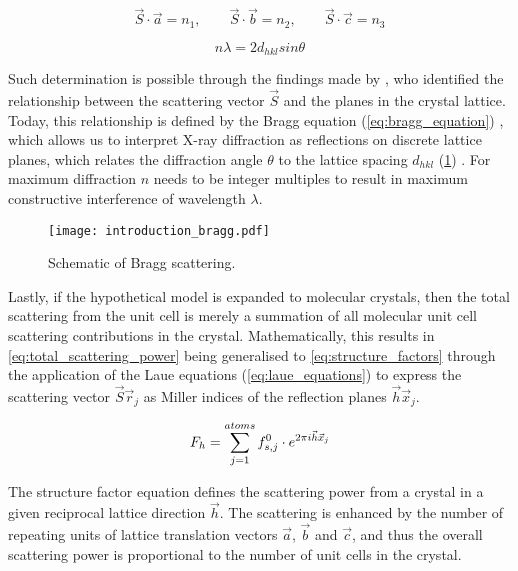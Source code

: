 \begin{equation}
    \vec{S} \cdot \vec{a}=n_1, \quad \quad \vec{S} \cdot \vec{b}=n_2, \quad \quad \vec{S} \cdot \vec{c}=n_3
    \label{eq:laue_equations}
\end{equation}

\begin{equation}
    n\lambda=2d_{hkl}sin\theta
    \label{eq:bragg_equation}
\end{equation}

Such determination is possible through the findings made by \textcite{Bragg1913-cx}, who identified the relationship between the scattering vector $\vec{S}$ and the planes in the crystal lattice. Today, this relationship is defined by the Bragg equation (\cref{eq:bragg_equation}) \cite{Bragg1913-cx}, which allows us to interpret X-ray diffraction as reflections on discrete lattice planes, which relates the diffraction angle $\theta$ to the lattice spacing $d_{hkl}$ (\cref{fig:introduction_bragg}) \cite{Rupp2010-nc}. For maximum diffraction $n$ needs to be integer multiples to result in maximum constructive interference of wavelength $\lambda$.

\begin{figure}[H]
    \centering
    \texttt{[image: introduction\_bragg.pdf]}
    \caption{Schematic of Bragg scattering.}
    \label{fig:introduction_bragg}
\end{figure}

Lastly, if the hypothetical model is expanded to molecular crystals, then the total scattering from the unit cell is merely a summation of all molecular unit cell scattering contributions in the crystal. Mathematically, this results in \cref{eq:total_scattering_power} being generalised to \cref{eq:structure_factors} through the application of the Laue equations (\cref{eq:laue_equations}) to express the scattering vector $\vec{S}\vec{r}_j$ as Miller indices of the reflection planes $\vec{h}\vec{x}_j$. 

\begin{equation}
    F_h=\sum_{j=1}^{atoms}f_{s,j}^0 \cdot e^{2\pi\\i\vec{h}\vec{x}_j}
    \label{eq:structure_factors}
\end{equation}

The structure factor equation defines the scattering power from a crystal in a given reciprocal lattice direction $\vec{h}$. The scattering is enhanced by the number of repeating units of lattice translation vectors $\vec{a}$, $\vec{b}$ and $\vec{c}$, and thus the overall scattering power is proportional to the number of unit cells in the crystal.

